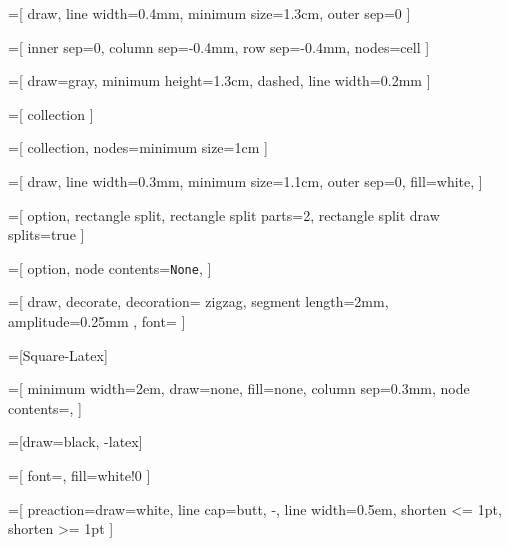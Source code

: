 \newcommand{\true}{\textcolor{green}{\ding{51}}}
\newcommand{\false}{\textcolor{red}{\ding{55}}}

\newcommand{\trueseq}{\tiny \true \, \true \, \true}
\newcommand{\falseseq}{\tiny \false \, \false \, \false}

=[
  draw,
  line width=0.4mm,
  minimum size=1.3cm,
  outer sep=0
]

=[
  inner sep=0,
  column sep=-0.4mm,
  row sep=-0.4mm,
  nodes=cell
]

=[
  draw=gray,
  minimum height=1.3cm,
  dashed,
  line width=0.2mm
]

=[
  collection
]

=[
  collection,
  nodes={minimum size=1cm}
]

=[
  draw,
  line width=0.3mm,
  minimum size=1.1cm,
  outer sep=0,
  fill=white,
]

=[
  option,
  rectangle split,
  rectangle split parts=2,
  rectangle split draw splits=true
]

\newcommand{\some}[1] {
  \small \texttt{Some} \nodepart{two} $b_i$
}

=[
  option,
  node contents={\small \texttt{None}},
]

=[
  draw,
  decorate,
  decoration={
    zigzag,
    segment length=2mm,
    amplitude=0.25mm
  },
  font=\ttfamily
]

=[Square-Latex]

\newcommand{\ellipsis}[1][15mm] {
  \node (x) [draw=none, minimum width=#1] {$\ldots$};
  \draw (x.north west) [ellipsis] -- (x.north east);
  \draw (x.south west) [ellipsis] -- (x.south east);
}
\newcommand{\vellipsis}[1][15mm]{
  \node (x) [draw=none, minimum height=#1] {$\vdots$};
  \draw (x.north west) [ellipsis] -- (x.south west);
  \draw (x.north east) [ellipsis] -- (x.south east);
}

=[
  minimum width=2em,
  draw=none,
  fill=none,
  column sep=0.3mm,
  node contents={,}
]

\newcommand{\tuplecomma}{ \node [tuple comma]; }

=[draw=black, -latex]

=[
  font=\small,
  fill=white!0
]

=[
  preaction={draw=white, line cap=butt, -, line width=0.5em},
  shorten <= 1pt,
  shorten >= 1pt
]

